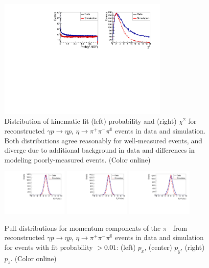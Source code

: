 \begin{figure}[tbp]
\begin{center}
\includegraphics[width=0.75\textwidth]{figures/gluex_nim_kfit_prob.pdf}
\caption{\label{fig:kinfitperform}
Distribution of kinematic fit (left) probability and (right) $\chi^2$ for reconstructed $\gamma p \to \eta p$,  $\eta \to \pi^+\pi^-\pi^0$ events in data and simulation.  Both distributions agree reasonably for well-measured events, and diverge due to additional background in data and differences in modeling poorly-measured events.
 (Color online)}
\end{center}
\end{figure}

\begin{figure}[tbp]
\begin{center}          \includegraphics[width=0.29\textwidth]{figures/gluex_nim_PiMinus_PxPull.pdf}
\includegraphics[width=0.29\textwidth]{figures/gluex_nim_PiMinus_PyPull.pdf}
\includegraphics[width=0.29\textwidth]{figures/gluex_nim_PiMinus_PzPull.pdf}

\caption{\label{fig:kinfitpulls}
Pull distributions for momentum components of the $\pi^-$ from reconstructed $\gamma p \to \eta p$,  $\eta \to \pi^+\pi^-\pi^0$ events in data and simulation for events with fit probability $>0.01$: (left) $p_x$, (center) $p_y$, (right) $p_z$.
 (Color online)}
\end{center}
\end{figure}

